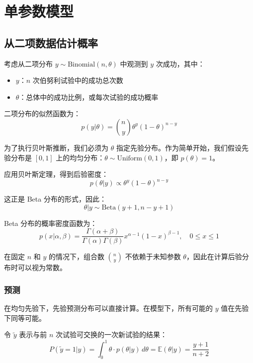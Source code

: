 
\chapter{单参数模型}

\section{从二项数据估计概率}

考虑从二项分布 $y \sim \text{Binomial}(n, \theta)$ 中观测到 $y$ 次成功，其中：
\begin{itemize}
  \item $y$：$n$ 次伯努利试验中的成功总次数
  \item $\theta$：总体中的成功比例，或每次试验的成功概率
\end{itemize}

二项分布的似然函数为：
\[
p(y|\theta) = \binom{n}{y} \theta^y (1-\theta)^{n-y}
\]

为了执行贝叶斯推断，我们必须为 $\theta$ 指定先验分布。作为简单开始，我们假设先验分布是 $[0, 1]$ 上的均匀分布：$\theta \sim \text{Uniform}(0, 1)$，即 $p(\theta) = 1$。

应用贝叶斯定理，得到后验密度：
\[
p(\theta|y) \propto \theta^y (1-\theta)^{n-y}
\]

这正是 Beta 分布的形式，因此：
\[
\theta|y \sim \text{Beta}(y+1, n-y+1)
\]

\begin{Definition}[Beta 分布]
  Beta 分布的概率密度函数为：
  \[
  p(x|\alpha, \beta) = \frac{\Gamma(\alpha+\beta)}{\Gamma(\alpha)\Gamma(\beta)} x^{\alpha-1}(1-x)^{\beta-1}, \quad 0 \leq x \leq 1
  \]
\end{Definition}

在固定 $n$ 和 $y$ 的情况下，组合数 $\binom{n}{y}$ 不依赖于未知参数 $\theta$，因此在计算后验分布时可以视为常数。

\subsection{预测}

在均匀先验下，先验预测分布可以直接计算。在模型下，所有可能的 $y$ 值在先验下同等可能。

令 $\tilde{y}$ 表示与前 $n$ 次试验可交换的一次新试验的结果：
\[
P(\tilde{y} = 1 | y) = \int_0^1 \theta \cdot p(\theta|y) \, d\theta = \mathbb{E}(\theta|y) = \frac{y+1}{n+2}
\]

